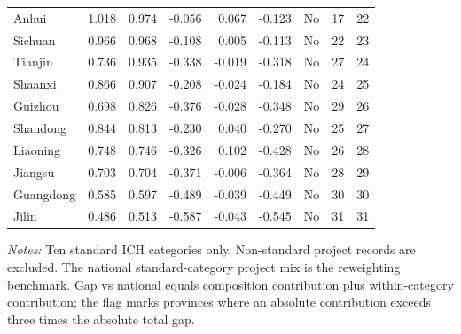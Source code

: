 \begin{table}[!htbp]
{\begin{tabular}{lrrrrrrrr}
Anhui & 1.018 & 0.974 & -0.056 & 0.067 & -0.123 & No & 17 & 22 \\
Sichuan & 0.966 & 0.968 & -0.108 & 0.005 & -0.113 & No & 22 & 23 \\
Tianjin & 0.736 & 0.935 & -0.338 & -0.019 & -0.318 & No & 27 & 24 \\
Shaanxi & 0.866 & 0.907 & -0.208 & -0.024 & -0.184 & No & 24 & 25 \\
Guizhou & 0.698 & 0.826 & -0.376 & -0.028 & -0.348 & No & 29 & 26 \\
Shandong & 0.844 & 0.813 & -0.230 & 0.040 & -0.270 & No & 25 & 27 \\
Liaoning & 0.748 & 0.746 & -0.326 & 0.102 & -0.428 & No & 26 & 28 \\
Jiangsu & 0.703 & 0.704 & -0.371 & -0.006 & -0.364 & No & 28 & 29 \\
Guangdong & 0.585 & 0.597 & -0.489 & -0.039 & -0.449 & No & 30 & 30 \\
Jilin & 0.486 & 0.513 & -0.587 & -0.043 & -0.545 & No & 31 & 31 \\
\bottomrule
\end{tabular}
}
\begin{minipage}{0.96\textwidth}
\footnotesize \textit{Notes:} Ten standard ICH categories only. Non-standard project records are excluded. The national standard-category project mix is the reweighting benchmark. Gap vs national equals composition contribution plus within-category contribution; the flag marks provinces where an absolute contribution exceeds three times the absolute total gap.
\end{minipage}
\end{table}
